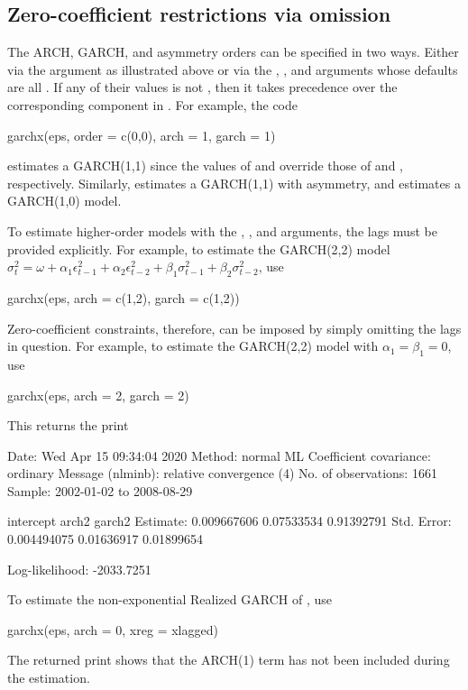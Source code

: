 \subsection{Zero-coefficient restrictions via omission}

The ARCH, GARCH, and asymmetry orders can be specified in two ways. Either via the  argument as illustrated above or via the , , and  arguments whose defaults are all . If any of their values is not , then it takes precedence over the corresponding component in . For example, the code
%
\begin{example}
	garchx(eps, order = c(0,0), arch = 1, garch = 1)
\end{example}
%
estimates a GARCH(1,1) since the values of  and  override those of  and , respectively. Similarly,  estimates a GARCH(1,1) with asymmetry, and  estimates a GARCH(1,0) model.

To estimate higher-order models with the , , and  arguments, the lags must be provided explicitly. For example, to estimate the GARCH(2,2) model $\sigma_t^2 = \omega + \alpha_1\epsilon_{t-1}^2 + \alpha_2\epsilon_{t-2}^2 +  \beta_1\sigma_{t-1}^2 + \beta_2\sigma_{t-2}^2$, use
%
\begin{example}
	garchx(eps, arch = c(1,2), garch = c(1,2))
\end{example}
%
Zero-coefficient constraints, therefore, can be imposed by simply omitting the lags in question. For example, to estimate the GARCH(2,2) model with $\alpha_1 = \beta_1 = 0$, use
%
\begin{example}
	garchx(eps, arch = 2, garch = 2)
\end{example}
%
This returns the print
%
\begin{example}
	Date: Wed Apr 15 09:34:04 2020 
	Method: normal ML
	Coefficient covariance: ordinary 
	Message (nlminb): relative convergence (4) 
	No. of observations: 1661 
	Sample: 2002-01-02 to 2008-08-29 
	
	              intercept      arch2     garch2
	Estimate:   0.009667606 0.07533534 0.91392791
	Std. Error: 0.004494075 0.01636917 0.01899654
	
	Log-likelihood: -2033.7251
\end{example}
%	 
To estimate the non-exponential Realized GARCH of \citet{HansenHuangSchek2012}, use
%
\begin{example}
	garchx(eps, arch = 0, xreg = xlagged)
\end{example}
%
The returned print shows that the ARCH(1) term has not been included during the estimation.

